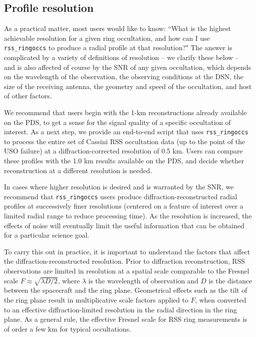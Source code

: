 \documentclass[titlepage, 12pt]{article}
\begin{document}
        \subsection{Profile resolution}\label{sec:resolutions}
        As a practical matter, most users would like to know: ``What is the highest achievable resolution for a given ring occultation, and how can I use \texttt{rss\_ringoccs} to produce a radial profile at that resolution?"
        The answer is complicated by a variety of definitions of resolution -- we clarify these below -- and is also affected of course by the SNR of any given occultation, which depends on the wavelength of the observation, the observing conditions at the DSN, the size of the receiving antenna, the geometry and speed of the occultation, and host of other factors. 
        \par\hfill\par
        We recommend that users begin with the 1-km reconstructions already available on the PDS, to get a sense for the signal quality of a specific occultation of interest. As a next step, we provide an end-to-end script that uses \texttt{rss\_ringoccs} to process the entire set of Cassini RSS occultation data (up to the point of the USO failure) at a diffraction-corrected resolution of 0.5 km. Users can compare these profiles with the 1.0 km results available on the PDS, and decide whether reconstruction at a different resolution is needed. 
              \par\hfill\par
        In cases where higher resolution is desired and is warranted by the SNR, we recommend that \texttt{rss\_ringoccs} users produce diffraction-reconstructed radial profiles at successively finer resolutions (centered on a feature of interest over a limited radial range to reduce processing time). As the resolution is increased, the effects of noise will eventually limit the useful information that can be obtained for a particular science goal.
        \par\hfill\par
        To carry this out in practice, it is important to understand the factors that affect the diffraction-reconstructed resolution.
        Prior to diffraction reconstruction, RSS observations are limited in resolution  at a spatial scale comparable to the Fresnel scale $F\approx\sqrt{\lambda D/2}$, where $\lambda$ is the wavelength of observation and $D$ is the distance between the spacecraft and the ring plane. Geometrical effects such as the tilt of the ring plane result in multiplicative scale factors applied to $F$, when converted to an effective diffraction-limited resolution in the radial direction in the ring plane. As a general rule, the effective Fresnel scale for RSS ring measurements is of order a few km for typical occultations. 
\end{document}

